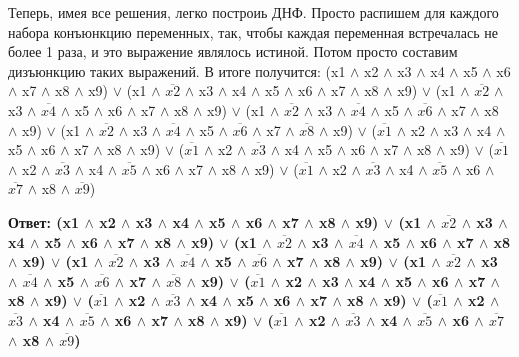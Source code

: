 \documentclass[12pt,a4paper]{scrartcl}
\begin{document}
	Теперь, имея все решения, легко построиь ДНФ. Просто распишем для каждого набора конъюнкцию переменных, так, чтобы каждая переменная встречалась не более 1 раза, и это выражение являлось истиной. Потом просто составим дизъюнкцию таких выражений. В итоге получится:
	\newline
	(x1 $\wedge$ x2 $\wedge$ x3 $\wedge$ x4 $\wedge$ x5 $\wedge$ x6 $\wedge$ x7 $\wedge$ x8 $\wedge$ x9) $\vee$ (x1 $\wedge$ $\overline{x2}$ $\wedge$ x3 $\wedge$ x4 $\wedge$ x5 $\wedge$ x6 $\wedge$ x7 $\wedge$ x8 $\wedge$ x9) $\vee$ (x1 $\wedge$ $\overline{x2}$ $\wedge$ x3 $\wedge$ $\overline{x4}$ $\wedge$ x5 $\wedge$ x6 $\wedge$ x7 $\wedge$ x8 $\wedge$ x9) $\vee$ (x1 $\wedge$ $\overline{x2}$ $\wedge$ x3 $\wedge$ $\overline{x4}$ $\wedge$ x5 $\wedge$ $\overline{x6}$ $\wedge$ x7 $\wedge$ x8 $\wedge$ x9) $\vee$ (x1 $\wedge$ $\overline{x2}$ $\wedge$ x3 $\wedge$ $\overline{x4}$ $\wedge$ x5 $\wedge$ $\overline{x6}$ $\wedge$ x7 $\wedge$ $\overline{x8}$ $\wedge$ x9) $\vee$ ($\overline{x1}$ $\wedge$ x2 $\wedge$ x3 $\wedge$ x4 $\wedge$ x5 $\wedge$ x6 $\wedge$ x7 $\wedge$ x8 $\wedge$ x9) $\vee$ ($\overline{x1}$ $\wedge$ x2 $\wedge$ $\overline{x3}$ $\wedge$ x4 $\wedge$ x5 $\wedge$ x6 $\wedge$ x7 $\wedge$ x8 $\wedge$ x9) $\vee$ ($\overline{x1}$ $\wedge$ x2 $\wedge$ $\overline{x3}$ $\wedge$ x4 $\wedge$ $\overline{x5}$ $\wedge$ x6 $\wedge$ x7 $\wedge$ x8 $\wedge$ x9)  $\vee$ ($\overline{x1}$ $\wedge$ x2 $\wedge$ $\overline{x3}$ $\wedge$ x4 $\wedge$ $\overline{x5}$ $\wedge$ x6 $\wedge$ $\overline{x7}$ $\wedge$ x8 $\wedge$ $\overline{x9}$)
	\begin{flushright}
	\textbf{Ответ: (x1 $\wedge$ x2 $\wedge$ x3 $\wedge$ x4 $\wedge$ x5 $\wedge$ x6 $\wedge$ x7 $\wedge$ x8 $\wedge$ x9) $\vee$ (x1 $\wedge$ $\overline{x2}$ $\wedge$ x3 $\wedge$ x4 $\wedge$ x5 $\wedge$ x6 $\wedge$ x7 $\wedge$ x8 $\wedge$ x9) $\vee$ (x1 $\wedge$ $\overline{x2}$ $\wedge$ x3 $\wedge$ $\overline{x4}$ $\wedge$ x5 $\wedge$ x6 $\wedge$ x7 $\wedge$ x8 $\wedge$ x9) $\vee$ (x1 $\wedge$ $\overline{x2}$ $\wedge$ x3 $\wedge$ $\overline{x4}$ $\wedge$ x5 $\wedge$ $\overline{x6}$ $\wedge$ x7 $\wedge$ x8 $\wedge$ x9) $\vee$ (x1 $\wedge$ $\overline{x2}$ $\wedge$ x3 $\wedge$ $\overline{x4}$ $\wedge$ x5 $\wedge$ $\overline{x6}$ $\wedge$ x7 $\wedge$ $\overline{x8}$ $\wedge$ x9) $\vee$ ($\overline{x1}$ $\wedge$ x2 $\wedge$ x3 $\wedge$ x4 $\wedge$ x5 $\wedge$ x6 $\wedge$ x7 $\wedge$ x8 $\wedge$ x9) $\vee$ ($\overline{x1}$ $\wedge$ x2 $\wedge$ $\overline{x3}$ $\wedge$ x4 $\wedge$ x5 $\wedge$ x6 $\wedge$ x7 $\wedge$ x8 $\wedge$ x9) $\vee$ ($\overline{x1}$ $\wedge$ x2 $\wedge$ $\overline{x3}$ $\wedge$ x4 $\wedge$ $\overline{x5}$ $\wedge$ x6 $\wedge$ x7 $\wedge$ x8 $\wedge$ x9)  $\vee$ ($\overline{x1}$ $\wedge$ x2 $\wedge$ $\overline{x3}$ $\wedge$ x4 $\wedge$ $\overline{x5}$ $\wedge$ x6 $\wedge$ $\overline{x7}$ $\wedge$ x8 $\wedge$ $\overline{x9}$)}
	\end{flushright}
\end{document}
